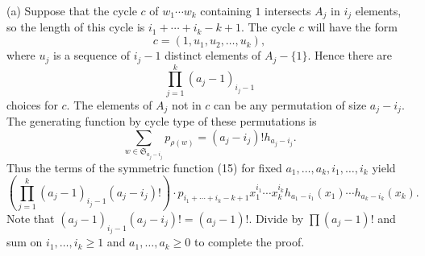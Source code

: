 (a) Suppose that the cycle $c$ of $w_1\cdots w_k$ containing $1$ intersects $A_j$ in $i_j$ elements, so the length of this cycle is $i_1+\cdots+i_k-k+1$. The cycle $c$ will have the form
\[
c=(1,u_1,u_2,\ldots,u_k),
\]
where $u_j$ is a sequence of $i_j-1$ distinct elements of $A_j-\{1\}$. Hence there are
\[
\prod_{j=1}^{k}(a_j-1)_{i_j-1}
\]
choices for $c$. The elements of $A_j$ not in $c$ can be any permutation of size $a_j-i_j$. The generating function by cycle type of these permutations is
\[
\sum_{w\in \mathfrak{S}_{a_j-i_j}}p_{\rho(w)}=(a_j-i_j)!h_{a_j-i_j}.
\]
Thus the terms of the symmetric function (15) for fixed $a_1,\ldots,a_k,i_1,\ldots,i_k$ yield
\[
\left(\prod_{j=1}^{k}(a_j-1)_{i_j-1}(a_j-i_j)!\right)\cdot p_{i_1+\cdots+i_k-k+1}x_1^{i_1}\cdots x_k^{i_k}h_{a_1-i_1}(x_1)\cdots h_{a_k-i_k}(x_k).
\]
Note that $(a_j-1)_{i_j-1}(a_j-i_j)!=(a_j-1)!$. Divide by $\prod(a_j-1)!$ and sum on $i_1,\ldots,i_k\ge1$ and $a_1,\ldots,a_k\ge0$ to complete the proof.
